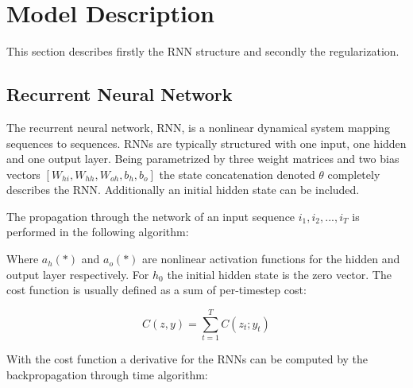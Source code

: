 \chapter{Model Description}

This section describes firstly the RNN structure and secondly the regularization.

\section{Recurrent Neural Network}

The recurrent neural network, RNN, is a nonlinear dynamical system mapping sequences to sequences. RNNs are typically structured with one input, one hidden and one output layer. Being parametrized by three weight matrices and two bias vectors \([W_{hi}, W_{hh}, W_{oh}, b_h, b_o]\) the state concatenation denoted \(\theta\) completely describes the RNN. Additionally an initial hidden state can be included.

The propagation through the network of an input sequence \(i_1, i_2, ... , i_T\) is performed in the following algorithm:

\begin{algorithmic}[1]
    \EndFor
\end{algorithmic}

Where $ a_h(*)$ and $a_o(*)$ are nonlinear activation functions for the hidden and output layer respectively. For $h_0$ the initial hidden state is the zero vector. The cost function is usually defined as a sum of per-timestep cost:

\[C(z, y) = \sum_{t=1}^{T}C(z_t; y_t)\]

With the cost function a derivative for the RNNs can be computed by the backpropagation through time algorithm:

\begin{algorithmic}[1]
    \EndFor
\end{algorithmic}